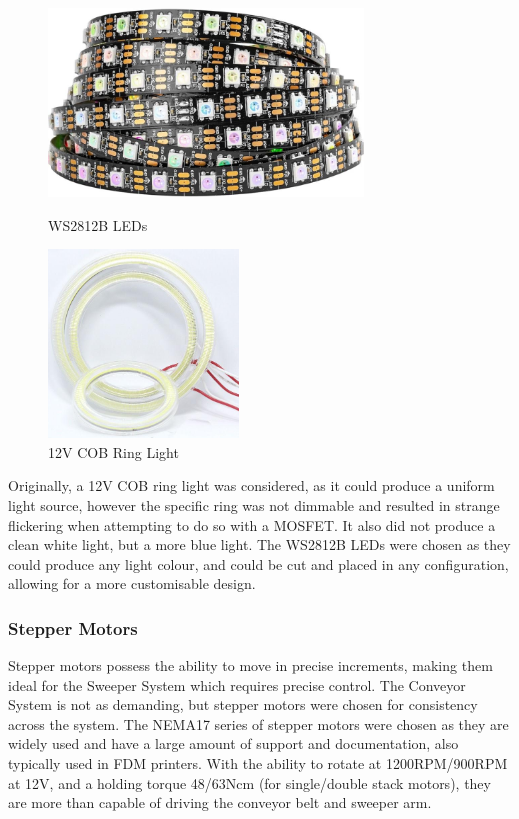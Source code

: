 \begin{figure}[H]
    \hfill
    \begin{minipage}[t]{0.45\textwidth}
      \centering
      \includegraphics[width=\textwidth,height=5cm, keepaspectratio]{imgs/parts/ws2812b.jpg}
        \caption{WS2812B LEDs \cite{ws2812b}}
    \end{minipage}
    \hfill
    \begin{minipage}[t]{0.45\textwidth}
        \centering
        \includegraphics[width=\textwidth,height=5cm, keepaspectratio]{imgs/parts/cob.jpeg}
        \caption{12V COB Ring Light}
      \end{minipage}
      \hfill
\end{figure}

Originally, a 12V COB ring light was considered, as it could produce a uniform light source, however the specific ring was not dimmable and resulted in strange flickering when attempting to do so with a MOSFET. It also did not produce a clean white light, but a more blue light. The WS2812B LEDs were chosen as they could produce any light colour, and could be cut and placed in any configuration, allowing for a more customisable design.

\subsubsection{Stepper Motors}
\label{sec:stepper-motors}
Stepper motors possess the ability to move in precise increments, making them ideal for the Sweeper System which requires precise control. The Conveyor System is not as demanding, but stepper motors were chosen for consistency across the system. The NEMA17 series of stepper motors were chosen \cite{nema17} as they are widely used and have a large amount of support and documentation, also typically used in FDM printers. With the ability to rotate at 1200RPM/900RPM at 12V, and a holding torque 48/63Ncm (for single/double stack motors), they are more than capable of driving the conveyor belt and sweeper arm.

